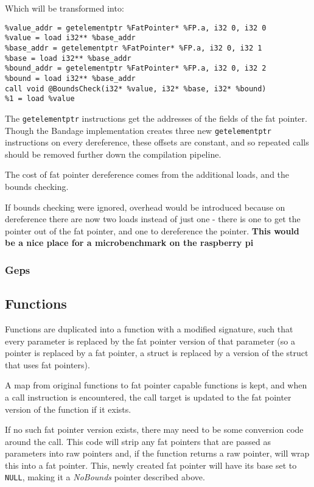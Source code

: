 Which will be transformed into:

\begin{verbatim}
%value_addr = getelementptr %FatPointer* %FP.a, i32 0, i32 0
%value = load i32** %base_addr
%base_addr = getelementptr %FatPointer* %FP.a, i32 0, i32 1
%base = load i32** %base_addr
%bound_addr = getelementptr %FatPointer* %FP.a, i32 0, i32 2
%bound = load i32** %base_addr
call void @BoundsCheck(i32* %value, i32* %base, i32* %bound)
%1 = load %value
\end{verbatim}

The \verb!getelementptr! instructions get the addresses of the fields of the fat pointer.
Though the Bandage implementation creates three new \verb!getelementptr! instructions on every dereference, these offsets are constant, and so repeated calls should be removed further down the compilation pipeline.

The cost of fat pointer dereference comes from the additional loads, and the bounds checking.

If bounds checking were ignored, overhead would be introduced because on dereference there are now two loads instead of just one - there is one to get the pointer out of the fat pointer, and one to dereference the pointer.
\textbf{This would be a nice place for a microbenchmark on the raspberry pi}

\subsubsection{Geps}

\subsection{Functions}

Functions are duplicated into a function with a modified signature, such that every parameter is replaced by the fat pointer version of that parameter (so a pointer is replaced by a fat pointer, a struct is replaced by a version of the struct that uses fat pointers).

A map from original functions to fat pointer capable functions is kept, and when a call instruction is encountered, the call target is updated to the fat pointer version of the function if it exists.

If no such fat pointer version exists, there may need to be some conversion code around the call.
This code will strip any fat pointers that are passed as parameters into raw pointers and, if the function returns a raw pointer, will wrap this into a fat pointer.
This, newly created fat pointer will have its base set to \verb!NULL!, making it a \textit{NoBounds} pointer described above.

